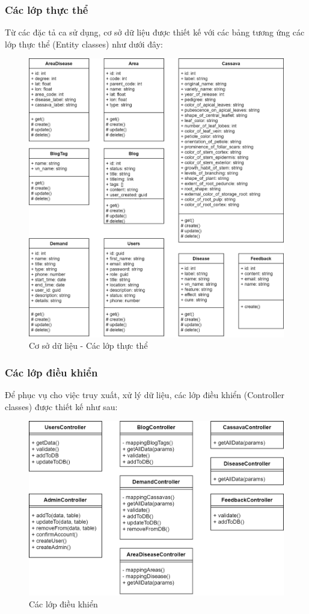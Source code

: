 \documentclass[./../main.tex]{subfiles}
\begin{document}
\subsubsection{Các lớp thực thể}
Từ các đặc tả ca sử dụng, cơ sở dữ liệu được thiết kế với các bảng tương ứng các lớp thực thể (Entity classes) như dưới đây:
\begin{figure}[H]
	\centering
	\includegraphics[width=\linewidth]{./img/entities.png}
	\caption{Cơ sở dữ liệu - Các lớp thực thể }
\end{figure}

\subsubsection{Các lớp điều khiển}
Để phục vụ cho việc truy xuất, xử lý dữ liệu, các lớp điều khiển (Controller classes) được thiết kế như sau:
\begin{figure}[H]
	\centering
	\includegraphics[width=\linewidth]{./img/controller.png}
	\caption{Các lớp điều khiển}
\end{figure}
\end{document}
